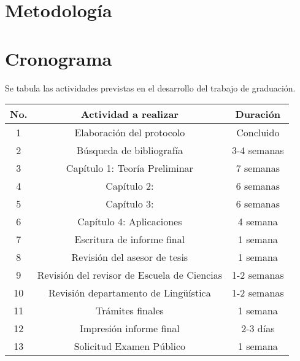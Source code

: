 \documentclass[12pt,letterpaper,titlepage]{article}
\begin{document}
\section{Metodología}


\newpage

\section{Cronograma}
Se tabula las actividades previstas en el desarrollo del trabajo de graduación.

\vspace{1cm}

\begin{tabular}{|c|c|c|}
  \hline
   \textbf{No.}  &  \textbf{Actividad a realizar} &  \textbf{Duración }\\ \hline
  1  & Elaboración del protocolo & Concluido \\
  2  & Búsqueda de bibliografía & 3-4 semanas \\
  3  & Capítulo 1: Teoría Preliminar & 7 semanas \\
  4  & Capítulo 2:  & 6 semanas \\
  5  & Capítulo 3: & 6 semanas \\
  6  & Capítulo 4: Aplicaciones & 4 semana \\
  7  & Escritura de informe final & 1 semana \\
  8  & Revisión del asesor de tesis & 1 semana \\
  9 & Revisión del revisor de Escuela de Ciencias & 1-2 semanas \\
  10 & Revisión departamento de Lingüística & 1-2 semanas \\
  11 & Trámites finales & 1 semana  \\
  12 & Impresión informe final & 2-3 días \\
  13 & Solicitud Examen Público & 1 semana \\
  \hline
\end{tabular}

\newpage
\end{document}
